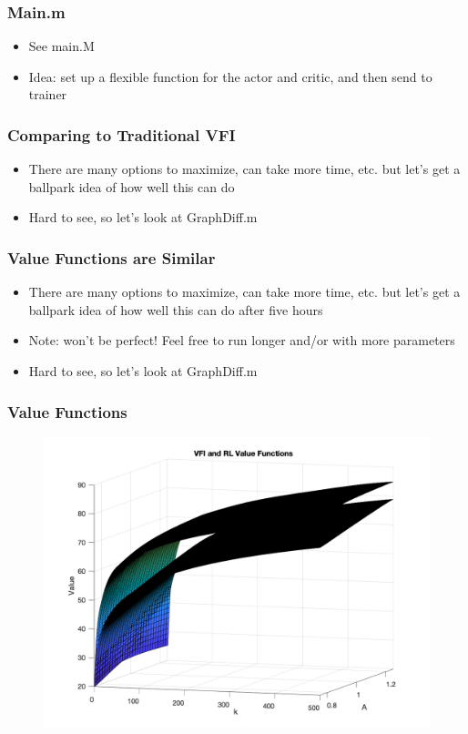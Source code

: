 \documentclass{beamer}
\begin{document}
\begin{frame}
\frametitle[alignment=center]{Main.m}
\begin{itemize}
\item See main.M
\bigskip
\item Idea:  set up a flexible function for the actor and critic, and then send to trainer
\end{itemize}
\end{frame}

\begin{frame}
\frametitle[alignment=center]{Comparing to Traditional VFI}
\begin{itemize}
\item There are many options to maximize, can take more time, etc.  but let's get a ballpark idea of how well this can do
\bigskip
\item Hard to see, so let's look at GraphDiff.m
\end{itemize}
\end{frame}

\begin{frame}
\frametitle[alignment=center]{Value Functions are Similar}
\begin{itemize}
\item There are many options to maximize, can take more time, etc.  but let's get a ballpark idea of how well this can do after five hours
\bigskip
\item Note: won't be perfect!  Feel free to run longer and/or with more parameters
\bigskip
\item Hard to see, so let's look at GraphDiff.m
\end{itemize}
\end{frame}

\begin{frame}
\frametitle[alignment=center]{Value Functions}
\begin{figure}
\centering
\includegraphics[scale=0.25]{Fig1.png}
\end{figure}
\end{frame}
\end{document}
